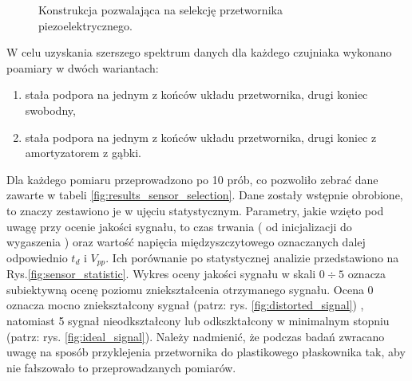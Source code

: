 \begin{figure}[tbhp]
\centering
{}%
\caption{Konstrukcja pozwalająca na selekcję przetwornika piezoelektrycznego.}
\label{fig:sensor_sel_geometry}
\end{figure}

\pagebreak 
W celu uzyskania szerszego spektrum danych dla każdego czujniaka wykonano
poamiary w dwóch wariantach: 
\begin{enumerate}
\item stała podpora na jednym z końców układu przetwornika, drugi koniec swobodny,\nopagebreak
\item stała podpora na jednym z końców układu przetwornika, drugi koniec z 
amortyzatorem z gąbki.
\end{enumerate}

Dla każdego pomiaru przeprowadzono po 10 prób, co pozwoliło zebrać dane zawarte w tabeli
\ref{fig:results_sensor_selection}. Dane zostały wstępnie obrobione, to znaczy zestawiono
je w ujęciu statystycznym.
Parametry, jakie wzięto pod uwagę przy ocenie jakości sygnału, to czas trwania 
( od inicjalizacji do wygaszenia ) oraz wartość napięcia międzyszczytowego oznaczanych 
dalej odpowiednio $t_d$ i $V_{pp}$. Ich porównanie po statystycznej analizie 
przedstawiono na Rys.\ref{fig:sensor_statistic}. Wykres oceny jakości sygnału w skali $0\div5$ 
oznacza subiektywną ocenę poziomu zniekształcenia otrzymanego sygnału. Ocena 0 oznacza mocno
zniekształcony sygnał (patrz: rys. \ref{fig:distorted_signal}) , natomiast 5 sygnał nieodkształcony 
lub odkszktałcony w minimalnym stopniu (patrz: rys. \ref{fig:ideal_signal}). 
Należy nadmienić, że podczas badań zwracano uwagę na sposób przyklejenia przetwornika do plastikowego 
płaskownika tak, aby nie fałszowało to przeprowadzanych pomiarów. 


\sensorSelTab


